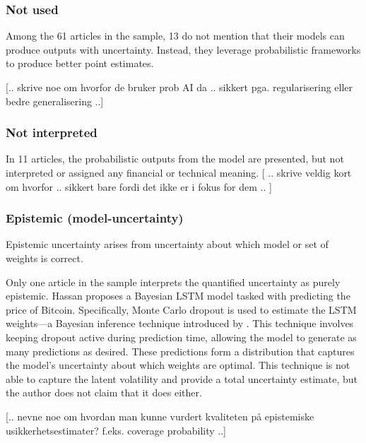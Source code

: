 \subsubsection{Not used}

Among the 61 articles in the sample, 13 do not mention that their models can produce outputs with uncertainty. Instead, they leverage probabilistic frameworks to produce better point estimates.


[.. skrive noe om hvorfor de bruker prob AI da .. sikkert pga. regularisering eller bedre generalisering ..]

\subsubsection{Not interpreted}

In 11 articles, the probabilistic outputs from the model are presented, but not interpreted or assigned any financial or technical meaning. [ .. skrive veldig kort om hvorfor .. sikkert bare fordi det ikke er i fokus for dem .. ]


\subsubsection{Epistemic (model-uncertainty)}
Epistemic uncertainty arises from uncertainty about which model or set of weights is correct.

Only one article in the sample \parencite{hassan2023} interprets the quantified uncertainty as purely epistemic. Hassan proposes a Bayesian LSTM model tasked with predicting the price of Bitcoin. Specifically, Monte Carlo dropout is used to estimate the LSTM weights—a Bayesian inference technique introduced by \textcite{gal_ghahramani_2015}. This technique involves keeping dropout active during prediction time, allowing the model to generate as many predictions as desired. These predictions form a distribution that captures the model's uncertainty about which weights are optimal. This technique is not able to capture the latent volatility and provide a total uncertainty estimate, but the author does not claim that it does either.

[.. nevne noe om hvordan man kunne vurdert kvaliteten på epistemiske usikkerhetsestimater? f.eks. coverage probability ..]


